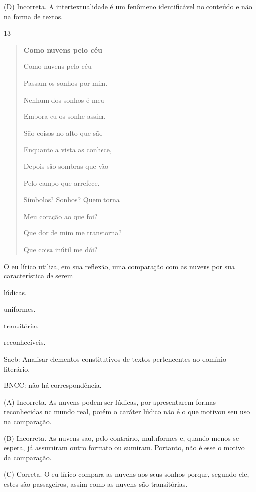 (D) Incorreta. A intertextualidade é um fenômeno identificável no
conteúdo e não na forma de textos.

\num{13}

\begin{quote}
\textbf{Como nuvens pelo céu}

Como nuvens pelo céu

Passam os sonhos por mim.

Nenhum dos sonhos é meu

Embora eu os sonhe assim.

São coisas no alto que são

Enquanto a vista as conhece,

Depois são sombras que vão

Pelo campo que arrefece.

Símbolos? Sonhos? Quem torna

Meu coração ao que foi?

Que dor de mim me transtorna?

Que coisa inútil me dói?
\end{quote}


O eu lírico utiliza, em sua reflexão, uma comparação com as nuvens por
sua característica de serem

\begin{escolha}
\item lúdicas.

\item uniformes.

\item transitórias.

\item reconhecíveis.
\end{escolha}

Saeb: Analisar elementos constitutivos de textos pertencentes ao domínio
literário.

BNCC: não há correspondência.

(A) Incorreta. As nuvens podem ser lúdicas, por apresentarem formas
reconhecidas no mundo real, porém o caráter lúdico não é o que motivou
seu uso na comparação.

(B) Incorreta. As nuvens são, pelo contrário, multiformes e, quando
menos se espera, já assumiram outro formato ou sumiram. Portanto, não é
esse o motivo da comparação.

(C) Correta. O eu lírico compara as nuvens aos seus sonhos porque,
segundo ele, estes são passageiros, assim como as nuvens são
transitórias.

